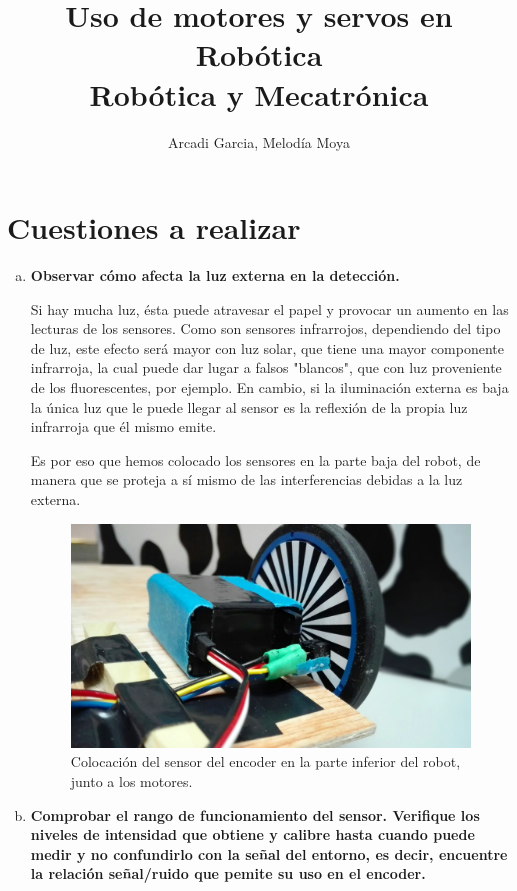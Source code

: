 \documentclass[11pt, a4paper]{article}
\begin{document}
\title{Uso de motores y servos en Robótica \\ {\Large Robótica y Mecatrónica}}
\author{Arcadi Garcia, Melodía Moya} \date{}
\maketitle

\section{Cuestiones a realizar}
		\begin{enumerate}[(a)]
			\item \textbf{Observar cómo afecta la luz externa en la detección.}
			
			Si hay mucha luz, ésta puede atravesar el papel y provocar un aumento en las lecturas de los sensores. Como son sensores infrarrojos, dependiendo del tipo de luz, este efecto será mayor con luz solar, que tiene una mayor componente infrarroja, la cual puede dar lugar a falsos "blancos", que con luz proveniente de los fluorescentes, por ejemplo.
En cambio, si la iluminación externa es baja la única luz que le puede llegar al sensor es la reflexión de la propia luz infrarroja que él mismo emite.

Es por eso que hemos colocado los sensores en la parte baja del robot, de manera que se proteja a sí mismo de las interferencias debidas a la luz externa.

			\begin{figure}[h!]
				\centering
				\includegraphics[width=.9\textwidth]{encoder}
				\caption*{Colocación del sensor del encoder en la parte inferior del robot, junto a los motores.}
			\end{figure}

			\item \textbf{Comprobar el rango de funcionamiento del sensor. Verifique los niveles de intensidad que obtiene y calibre hasta cuando puede medir y no confundirlo con la señal del entorno, es decir, encuentre la relación señal/ruido que pemite su uso en el encoder.}
			

\end{enumerate}
\end{document}
